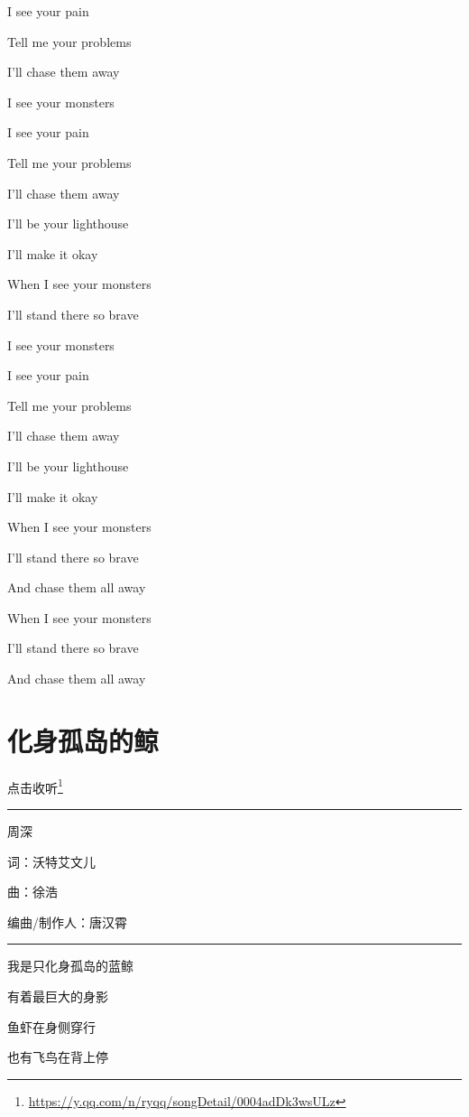 \documentclass[]{ctexbook}
\renewcommand{\href}[2]{#2\footnote{\url{#1}}}
\begin{document}
I see your pain

Tell me your problems

I'll chase them away

I see your monsters

I see your pain

Tell me your problems

I'll chase them away

I'll be your lighthouse

I'll make it okay

When I see your monsters

I'll stand there so brave

I see your monsters

I see your pain

Tell me your problems

I'll chase them away

I'll be your lighthouse

I'll make it okay

When I see your monsters

I'll stand there so brave

And chase them all away

When I see your monsters

I'll stand there so brave

And chase them all away

\section*{化身孤岛的鲸}\label{hua-shen-gu-dao-de-jing}


\href{https://y.qq.com/n/ryqq/songDetail/0004adDk3wsULz}{点击收听}

\begin{center}\rule{0.5\linewidth}{0.5pt}\end{center}

周深

词：沃特艾文儿

曲：徐浩

编曲/制作人：唐汉霄

\begin{center}\rule{0.5\linewidth}{0.5pt}\end{center}

我是只化身孤岛的蓝鲸

有着最巨大的身影

鱼虾在身侧穿行

也有飞鸟在背上停
\end{document}
